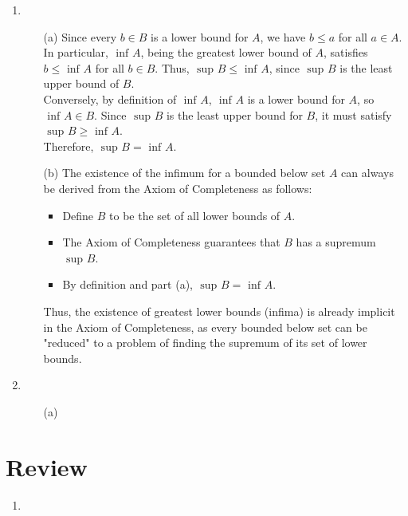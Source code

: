 \begin{enumerate}
    \item
      \begin{enumerate}
        \item[(a)] Since every $b \in B$ is a lower bound for $A$, we have $b \leq a$ for all $a \in A$. In particular, $\text{ inf } A$, being the greatest lower bound of $A$, satisfies $b \leq \text{ inf } A$ for all $b \in B$. Thus, $\text{ sup } B \leq \text{ inf } A$, since $\text{ sup } B$ is the least upper bound of $B$. \\
        Conversely, by definition of $\text{ inf } A$, $\text{ inf } A$ is a lower bound for $A$, so $\text{ inf } A \in B$. Since $\text{ sup } B$ is the least upper bound for $B$, it must satisfy $\text{ sup } B \geq \text{ inf } A$. \\
        Therefore, $\text{ sup } B = \text{ inf } A$.
      \item[(b)] The existence of the infimum for a bounded below set $A$ can always be derived from the Axiom of Completeness as follows:
        \begin{itemize}
          \item Define $B$ to be the set of all lower bounds of $A$.
          \item The Axiom of Completeness guarantees that $B$ has a supremum $\text{ sup } B$.
          \item By definition and part (a), $\text{ sup } B = \text{ inf } A$.
        \end{itemize}
        Thus, the existence of greatest lower bounds (infima) is already implicit in the Axiom of Completeness, as every bounded below set can be "reduced" to a problem of finding the supremum of its set of lower bounds.
      \end{enumerate}

    \item 
      \begin{enumerate}
        \item[(a)]  
      \end{enumerate}
\end{enumerate}

\section*{Review}
\begin{enumerate}
  \item 
\end{enumerate}



